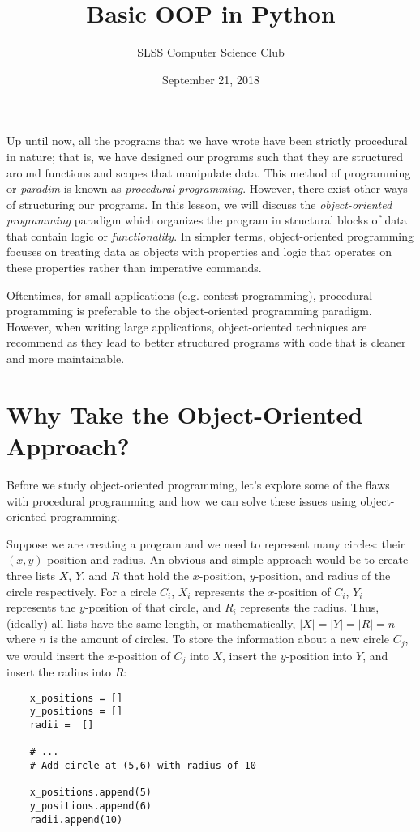 \documentclass{cslesson}
\title{Basic OOP in Python}
\author{SLSS Computer Science Club}
\date{September 21, 2018}
\begin{document}
\maketitle

Up until now, all the programs that we have wrote have been strictly procedural in nature; that is, we have designed our programs
such that they are structured around functions and scopes that manipulate data. This method of programming or \textit{paradim} is known
as \textit{procedural programming}. However, there exist other ways of structuring our programs. In this lesson, we will discuss the
\textit{object-oriented programming} paradigm which organizes the program in structural blocks of data that contain logic or \textit{functionality}. 
In simpler terms, object-oriented programming focuses on treating data as objects with properties and logic that operates on these properties rather than 
imperative commands.

Oftentimes, for small applications (e.g. contest programming), procedural programming is preferable to the object-oriented programming paradigm. However,
when writing large applications, object-oriented techniques are recommend as they lead to better structured programs with code that is cleaner and 
more maintainable. 

\section{Why Take the Object-Oriented Approach?}

Before we study object-oriented programming, let's explore some of the flaws with procedural programming
and how we can solve these issues using object-oriented programming.

Suppose we are creating a program and we need to represent many circles: their $(x,y)$ position and radius. An obvious and simple approach
would be to create three lists $X$, $Y$, and $R$ that hold the $x$-position, $y$-position, and radius of the circle respectively. For a circle $C_i$, $X_i$
represents the $x$-position of $C_i$, $Y_i$ represents the $y$-position of that circle, and $R_i$ represents the radius. Thus, (ideally) all lists have the 
same length, or mathematically, $\left|X\right|=\left|Y\right|=\left|R\right|=n$ where $n$ is the amount of circles. To store the information
about a new circle $C_j$, we would insert the $x$-position of $C_j$ into $X$, insert the $y$-position into $Y$, and insert the radius into $R$:
\begin{verbatim}
    x_positions = []
    y_positions = []
    radii =  []
    
    # ...
    # Add circle at (5,6) with radius of 10
    
    x_positions.append(5)
    y_positions.append(6)
    radii.append(10)
        
\end{verbatim}
\end{document}
